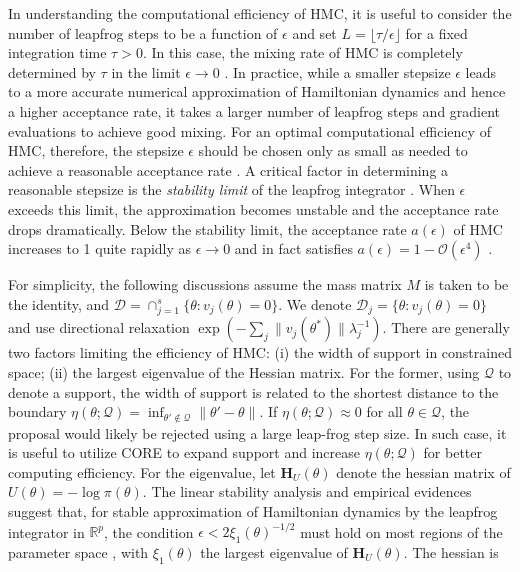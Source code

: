 \documentclass[10pt,fleqn]{article} \pdfoutput=1
\newcommand{\bb}[1]{\mathbb{#1}} \newcommand{\mc}[1]{\mathcal{#1}}
\DeclareMathOperator{\1}{\mathbbm{1}} \DeclareMathOperator{\bigO}{\mc O}
\newcommand{\dt}{\epsilon} %
\newcommand{\mass}{M} %
\newcommand{\hess}{\mathbf{H}} %
\begin{document}
In understanding the computational efficiency of HMC, it is useful to
consider the number of leapfrog steps to be a function of $\dt$ and set $L
	= \lfloor \tau / \dt \rfloor$ for a fixed integration time $\tau > 0$. In
this case, the mixing rate of HMC is completely determined by $\tau$ in the
limit $\dt \to 0$ \citep{betancourt17}. In practice, while a smaller
stepsize $\dt$ leads to a more accurate numerical approximation of
Hamiltonian dynamics and hence a higher acceptance rate, it takes a larger
number of leapfrog steps and gradient evaluations to achieve good mixing.
For an optimal computational efficiency of HMC, therefore, the stepsize
$\dt$ should be chosen only as small as needed to achieve a reasonable
acceptance rate \citep{beskos13, betancourt14}. A critical factor in
determining a reasonable stepsize is the \textit{stability limit} of the
leapfrog integrator \citep{neal2011mcmc}. When $\dt$ exceeds this limit,
the approximation becomes unstable and the acceptance rate drops
dramatically. Below the stability limit, the acceptance rate $a(\dt)$ of
HMC increases to 1 quite rapidly as $\dt \to 0$ and in fact satisfies
$a(\dt) = 1 - \mc O(\dt^4)$ \citep{beskos13}.

For simplicity, the following discussions assume the mass matrix $\mass$ is
taken to be the identity, and $\mc D= \cap_{j=1}^s\{\theta :v_j(\theta)=0 \}$.
We denote $\mc D_j= \{\theta :v_j(\theta)=0 \}$ and use directional relaxation
$\exp(-\sum_j{\|v_j(\theta^*)\|}{\lambda_j^{-1}})$. There are generally two factors limiting the efficiency of HMC:
(i) the width of support in constrained space; (ii) the largest eigenvalue of the Hessian matrix.
For the former, using $\mc Q$ to denote a support, the width of support is related to the shortest
distance to the boundary $\eta (\theta; {\mc Q})= \inf_{\theta'\not\in \mc
		Q}\|\theta'-\theta\|$. If $\eta (\theta; {\mc Q}) \approx 0$ for all $\theta\in \mc Q$,
		 the proposal would likely be rejected using a large leap-frog step size. In such case, 
		 it is useful to utilize CORE to expand support and  
increase $\eta (\theta; {\mc Q})$ for better computing efficiency. For the eigenvalue,
let $\hess_U(\theta)$ denote the hessian matrix of
$U(\theta) = - \log \pi(\theta)$. 
The linear stability analysis and
empirical evidences suggest that, for stable approximation of Hamiltonian
dynamics by the leapfrog integrator in $\bb R^p$, the condition $\dt <
	2\xi_1(\theta)^{-1/2}$ must hold on most regions of the parameter space
\citep{hairer06}, with $\xi_1(\theta)$ the largest
eigenvalue of $\hess_U(\theta)$. The hessian is
\end{document}
